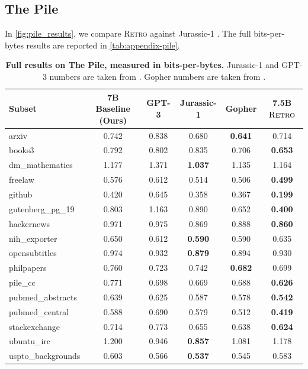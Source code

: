 \documentclass[11pt, a4paper, logo]{deepmind}
\newcommand{\retro}{\textsc{Retro}\xspace}
\begin{document}
\subsection{The Pile}

In \autoref{fig:pile_results}, we compare \retro against Jurassic-1 \citep{jurassic}. The full bits-per-bytes results are reported in \autoref{tab:appendix-pile}.
\begin{table}[h]
    \caption{\textbf{Full results on The Pile, measured in bits-per-bytes.} Jurassic-1 and GPT-3 numbers are taken from \citet{jurassic}. Gopher numbers are taken from \citet{rae2021gopher}.}
    \small
    \vspace{2.0mm}
    \centering
    \begin{tabular}{l  c  c  c  c c }
        Subset & 7B Baseline (Ours) & GPT-3 & Jurassic-1 & Gopher & 7.5B $\retro$\\ 
        \toprule
        arxiv & 0.742 & 0.838 & 0.680 & \textbf{0.641} & 0.714 \\
        books3 & 0.792 & 0.802 & 0.835 & 0.706 & \textbf{0.653} \\
        dm\_mathematics & 1.177 & 1.371 & \textbf{1.037} & 1.135 & 1.164 \\
        freelaw & 0.576 & 0.612 & 0.514 & 0.506 & \textbf{0.499} \\
        github & 0.420 & 0.645 & 0.358 & 0.367 & \textbf{0.199} \\
        gutenberg\_pg\_19 & 0.803 & 1.163 & 0.890 & 0.652 & \textbf{0.400} \\
        hackernews & 0.971 & 0.975 & 0.869 & 0.888 & \textbf{0.860} \\
        nih\_exporter & 0.650 & 0.612 & \textbf{0.590} & 0.590 & 0.635 \\
        opensubtitles & 0.974 & 0.932 & \textbf{0.879} & 0.894 & 0.930 \\
        philpapers & 0.760 & 0.723 & 0.742 & \textbf{0.682} & 0.699 \\
        pile\_cc & 0.771 & 0.698 & 0.669 & 0.688 & \textbf{0.626} \\
        pubmed\_abstracts & 0.639 & 0.625 & 0.587 & 0.578 & \textbf{0.542} \\
        pubmed\_central & 0.588 & 0.690 & 0.579 & 0.512 & \textbf{0.419} \\
        stackexchange & 0.714 & 0.773 & 0.655 & 0.638 & \textbf{0.624} \\
        ubuntu\_irc & 1.200 & 0.946 & \textbf{0.857} & 1.081 & 1.178 \\
        uspto\_backgrounds & 0.603 & 0.566 & \textbf{0.537} & 0.545 & 0.583 \\
    \end{tabular}

    \label{tab:appendix-pile}
\end{table}
\end{document}
